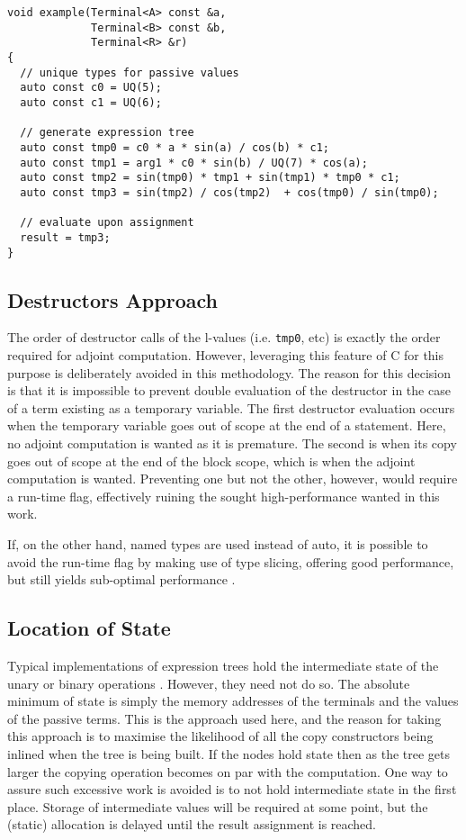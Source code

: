 \documentclass[a4paper,10pt]{article}
\def\CC{{C\nolinebreak[4]\hspace{-.05em}\raisebox{.4ex}{\tiny\bf ++}}}
\begin{document}
\begin{lstlisting}[caption={All terminal nodes require unique types, both for active and passive values.}, label=lst:example]
void example(Terminal<A> const &a,
             Terminal<B> const &b,
             Terminal<R> &r)
{
  // unique types for passive values
  auto const c0 = UQ(5);
  auto const c1 = UQ(6);

  // generate expression tree
  auto const tmp0 = c0 * a * sin(a) / cos(b) * c1;
  auto const tmp1 = arg1 * c0 * sin(b) / UQ(7) * cos(a);
  auto const tmp2 = sin(tmp0) * tmp1 + sin(tmp1) * tmp0 * c1;
  auto const tmp3 = sin(tmp2) / cos(tmp2)  + cos(tmp0) / sin(tmp0);

  // evaluate upon assignment
  result = tmp3;
}
\end{lstlisting}


\subsection{Destructors Approach}
The order of destructor calls of the l-values (i.e. \texttt{tmp0}, etc) is exactly the order required for adjoint computation.
However, leveraging this feature of {\CC} for this purpose is deliberately avoided in this methodology. The reason for
this decision is that it is impossible to prevent double evaluation of the destructor in the case of a term existing as a
temporary variable. The first destructor evaluation occurs when the temporary variable goes out of scope at the end
of a statement. Here, no adjoint computation is wanted as it is premature. The second is when its copy goes out of
scope at the end of the block scope, which is when the adjoint computation is wanted. Preventing one but not the
other, however, would require a run-time flag, effectively ruining the sought high-performance wanted in this work.

If, on the other hand, named types are used instead of auto, it is possible to avoid the run-time flag by making use
of type slicing, offering good performance, but still yields sub-optimal performance \citep{jones2016proceedings}.

\subsection{Location of State}
Typical implementations of expression trees hold the intermediate state of the unary or binary operations \citep{Hogan2014FRM}.
However, they need not do so. The absolute minimum of state is simply the memory addresses of the terminals and
the values of the passive terms. This is the approach used here, and the reason for taking this approach is to maximise
the likelihood of all the copy constructors being inlined when the tree is being built. If the nodes hold state then as
the tree gets larger the copying operation becomes on par with the computation. One way to assure such excessive
work is avoided is to not hold intermediate state in the first place. Storage of intermediate values will be required at
some point, but the (static) allocation is delayed until the result assignment is reached.
\end{document}
